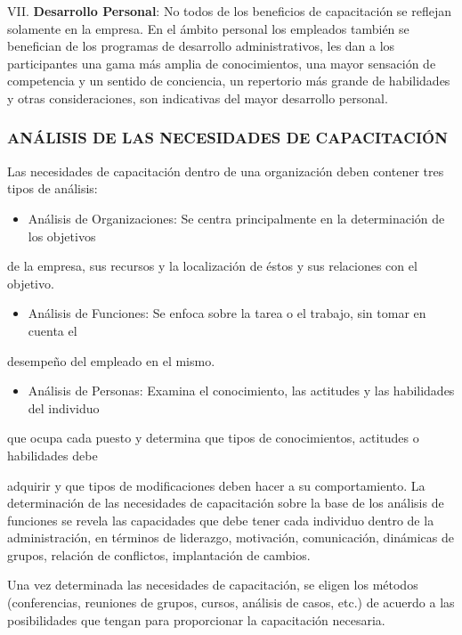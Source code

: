 VII. \textbf{Desarrollo Personal}: No todos de los beneficios de capacitación se reflejan solamente en la empresa. En el ámbito personal los empleados también se benefician de los programas de desarrollo administrativos, les dan a los participantes una gama más amplia de conocimientos, una mayor sensación de competencia y un sentido de conciencia, un repertorio más grande de habilidades y otras consideraciones, son indicativas del mayor desarrollo personal.

\subsubsection*{ANÁLISIS DE LAS NECESIDADES DE CAPACITACIÓN}
Las necesidades de capacitación dentro de una organización deben contener tres tipos de análisis:

\begin{itemize}
  \item Análisis de Organizaciones: Se centra principalmente en la determinación de los objetivos
\end{itemize}
de la empresa, sus recursos y la localización de éstos y sus relaciones con el objetivo.

\begin{itemize}
  \item Análisis de Funciones: Se enfoca sobre la tarea o el trabajo, sin tomar en cuenta el
\end{itemize}
desempeño del empleado en el mismo.

\begin{itemize}
  \item Análisis de Personas: Examina el conocimiento, las actitudes y las habilidades del individuo
\end{itemize}
que ocupa cada puesto y determina que tipos de conocimientos, actitudes o habilidades debe



adquirir y que tipos de modificaciones deben hacer a su comportamiento. La determinación de las necesidades de capacitación sobre la base de los análisis de funciones se revela las capacidades que debe tener cada individuo dentro de la administración, en términos de liderazgo, motivación, comunicación, dinámicas de grupos, relación de conflictos, implantación de cambios.

Una vez determinada las necesidades de capacitación, se eligen los métodos (conferencias, reuniones de grupos, cursos, análisis de casos, etc.) de acuerdo a las posibilidades que tengan para proporcionar la capacitación necesaria.


